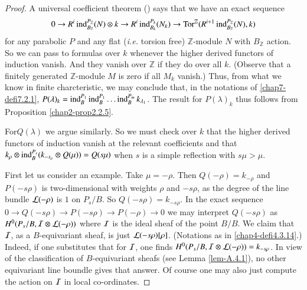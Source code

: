 \begin{proof}
A universal coefficient theorem (\cite[I 4.18]{key11}) says that we
have an exact sequence
$$
0\to R^{i}\operatorname{ind}^{P_{\mathbb{Z}}}_{B_{\mathbb{Z}}}(N)\otimes k\to
R^{i}\operatorname{ind}^{P_{k}}_{B_{k}}(N_{k})\to
\operatorname{Tor}^{\mathbb{Z}}(R^{i+1}\operatorname{ind}^{P_{\mathbb{Z}}}_{B_{\mathbb{Z}}}(N),k) 
$$
for any parabolic $P$ and any flat ({\em i.e.} torsion free)
$\mathbb{Z}$-module $N$ with $B_{\mathbb{Z}}$ action. So we can pass
to formulas over $k$ whenever the higher derived functors of induction
vanish. And they vanish over $\mathbb{Z}$ if they do over all
$k$. (Observe that a finitely generated $\mathbb{Z}$-module $M$ is
zero if all $M_{k}$ vanish.) Thus, from what we know in finite
charcteristic, we may conclude that, in the notations of
\ref{chap7-defi7.2.1},
$P(\lambda)_{k}=\operatorname{ind}^{P_{1}}_{B}\operatorname{ind}^{P_{1}}_{B}\ldots\operatorname{ind}^{P_{m}}_{B}k_{\lambda_{1}}$. The
result for $P(\lambda)_{k}$ thus follows from Proposition
\ref{chap2-prop2.2.5}. 

For\pageoriginale $Q(\lambda)$\label{page71} we argue similarly. So we must check
over $k$ that the higher derived functors of induction vanish at the
relevant coefficients and that $k_{\rho}\otimes
\operatorname{ind}^{P_{s}}_{B}(k_{-s_{\rho}}\otimes Q(\mu))=Q(s\mu)$ when $s$ is a
simple reflection with $s\mu>\mu$. 

First let us consider an example. Take $\mu=-\rho$. Then
$Q(-\rho)=k_{-\rho}$ and $P(-s\rho)$ is two-dimensional with weights
$\rho$ and $-s\rho$, as the degree of the line bundle $\mathcal{L}(-\rho)$ is
$1$ on $P_{s}/B$. So $Q(-s\rho)=k_{-s\rho}$. In the exact sequence
$0\to Q(-s\rho)\to P(-s\rho)\to P(-\rho)\to 0$ we may interpret
$Q(-s\rho)$ as $H^{0}(P_{s}/B,\mathcal{I}\otimes \mathcal{L}(-\rho))$ where $\mathcal{I}$ is the
ideal sheaf of the point $B/B$. We claim that $\mathcal{I}$, as a
$B$-equivariant sheaf, is just $\mathcal{L}(-s\rho)[\rho]$. (Notations as in
\ref{chap4-defi4.3.14}.) Indeed, if one substitutes that for $\mathcal{I}$, one
finds $H^{0}(P_{s}/B,\mathcal{I}\otimes \mathcal{L}(-\rho))=k_{-s\rho}$. In view of the
classification of $B$-equivariant sheafs (see Lemma \ref{lem-A.4.1}), no other
equivariant line boundle gives that answer. Of course one may also
just compute the action on $\mathcal{I}$ in local co-ordinates.


\end{proof}
